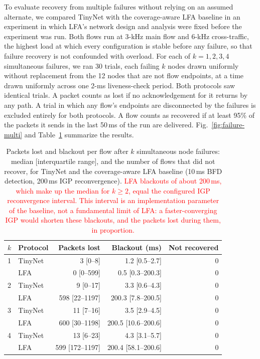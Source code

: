 To evaluate recovery from multiple failures without relying on an assumed alternate, we compared TinyNet with the coverage-aware LFA baseline in an experiment in which LFA's network design and analysis were fixed before the experiment was run. Both flows run at 3-kHz main flow and 6-kHz cross-traffic, the highest load at which every configuration is stable before any failure, so that failure recovery is not confounded with overload. For each of $k = 1, 2, 3, 4$ simultaneous failures, we ran 30 trials, each failing $k$ nodes drawn uniformly without replacement from the 12 nodes that are not flow endpoints, at a time drawn uniformly across one 2-ms liveness-check period. Both protocols saw identical trials. A packet counts as lost if no acknowledgement for it returns by any path. A trial in which any flow's endpoints are disconnected by the failures is excluded entirely for both protocols. A flow counts as recovered if at least 95\% of the packets it sends in the last 50\,ms of the run are delivered. Fig.~\ref{fig:failure-multi} and Table~\ref{tab:failure-multi} summarize the results.

\begin{table}[th]
    \centering
    \caption{Packets lost and blackout per flow after $k$ simultaneous node failures: median [interquartile range], and the number of flows that did not recover, for TinyNet and the coverage-aware LFA baseline (10\,ms BFD detection, 200\,ms IGP reconvergence). \textcolor{red}{LFA blackouts of about 200\,ms, which make up the median for $k \geq 2$, equal the configured IGP reconvergence interval. This interval is an implementation parameter of the baseline, not a fundamental limit of LFA: a faster-converging IGP would shorten these blackouts, and the packets lost during them, in proportion.}}
    \label{tab:failure-multi}
    \begin{tabular}{llrrr}
        \hline
        $k$ & Protocol & Packets lost & Blackout (ms) & Not recovered \\
        \hline
        1 & TinyNet & 3 [0--8] & 1.2 [0.5--2.7] & 0 \\
          & LFA     & 0 [0--599] & 0.5 [0.3--200.3] & 0 \\
        2 & TinyNet & 9 [0--17] & 3.3 [0.6--4.3] & 0 \\
          & LFA     & 598 [22--1197] & 200.3 [7.8--200.5] & 0 \\
        3 & TinyNet & 11 [7--16] & 3.5 [2.9--4.5] & 0 \\
          & LFA     & 600 [30--1198] & 200.5 [10.6--200.6] & 0 \\
        4 & TinyNet & 13 [6--23] & 4.3 [3.1--5.7] & 0 \\
          & LFA     & 599 [172--1197] & 200.4 [58.1--200.6] & 0 \\
        \hline
    \end{tabular}
\end{table}

